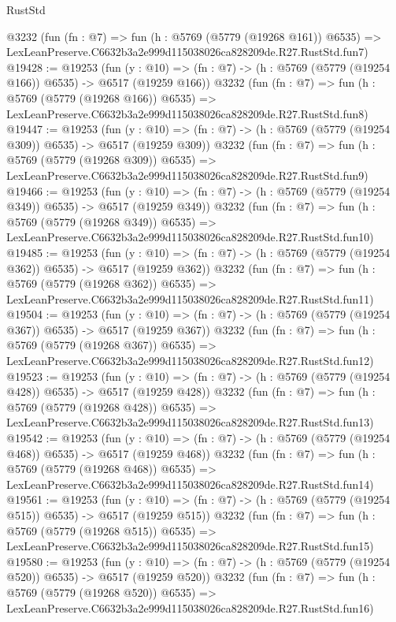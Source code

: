 \begin{lexlean}{RustStd}
\begin{coremodule}
    @3232
    (fun (fn : @7) =>
    fun (h : @5769 (@5779 (@19268 @161)) @6535) =>
    LexLeanPreserve.C6632b3a2e999d115038026ca828209de.R27.RustStd.fun7)
@19428 := @19253
    (fun (y : @10) => (fn : @7) -> (h : @5769 (@5779 (@19254 @166)) @6535) -> @6517 (@19259 @166))
    @3232
    (fun (fn : @7) =>
    fun (h : @5769 (@5779 (@19268 @166)) @6535) =>
    LexLeanPreserve.C6632b3a2e999d115038026ca828209de.R27.RustStd.fun8)
@19447 := @19253
    (fun (y : @10) => (fn : @7) -> (h : @5769 (@5779 (@19254 @309)) @6535) -> @6517 (@19259 @309))
    @3232
    (fun (fn : @7) =>
    fun (h : @5769 (@5779 (@19268 @309)) @6535) =>
    LexLeanPreserve.C6632b3a2e999d115038026ca828209de.R27.RustStd.fun9)
@19466 := @19253
    (fun (y : @10) => (fn : @7) -> (h : @5769 (@5779 (@19254 @349)) @6535) -> @6517 (@19259 @349))
    @3232
    (fun (fn : @7) =>
    fun (h : @5769 (@5779 (@19268 @349)) @6535) =>
    LexLeanPreserve.C6632b3a2e999d115038026ca828209de.R27.RustStd.fun10)
@19485 := @19253
    (fun (y : @10) => (fn : @7) -> (h : @5769 (@5779 (@19254 @362)) @6535) -> @6517 (@19259 @362))
    @3232
    (fun (fn : @7) =>
    fun (h : @5769 (@5779 (@19268 @362)) @6535) =>
    LexLeanPreserve.C6632b3a2e999d115038026ca828209de.R27.RustStd.fun11)
@19504 := @19253
    (fun (y : @10) => (fn : @7) -> (h : @5769 (@5779 (@19254 @367)) @6535) -> @6517 (@19259 @367))
    @3232
    (fun (fn : @7) =>
    fun (h : @5769 (@5779 (@19268 @367)) @6535) =>
    LexLeanPreserve.C6632b3a2e999d115038026ca828209de.R27.RustStd.fun12)
@19523 := @19253
    (fun (y : @10) => (fn : @7) -> (h : @5769 (@5779 (@19254 @428)) @6535) -> @6517 (@19259 @428))
    @3232
    (fun (fn : @7) =>
    fun (h : @5769 (@5779 (@19268 @428)) @6535) =>
    LexLeanPreserve.C6632b3a2e999d115038026ca828209de.R27.RustStd.fun13)
@19542 := @19253
    (fun (y : @10) => (fn : @7) -> (h : @5769 (@5779 (@19254 @468)) @6535) -> @6517 (@19259 @468))
    @3232
    (fun (fn : @7) =>
    fun (h : @5769 (@5779 (@19268 @468)) @6535) =>
    LexLeanPreserve.C6632b3a2e999d115038026ca828209de.R27.RustStd.fun14)
@19561 := @19253
    (fun (y : @10) => (fn : @7) -> (h : @5769 (@5779 (@19254 @515)) @6535) -> @6517 (@19259 @515))
    @3232
    (fun (fn : @7) =>
    fun (h : @5769 (@5779 (@19268 @515)) @6535) =>
    LexLeanPreserve.C6632b3a2e999d115038026ca828209de.R27.RustStd.fun15)
@19580 := @19253
    (fun (y : @10) => (fn : @7) -> (h : @5769 (@5779 (@19254 @520)) @6535) -> @6517 (@19259 @520))
    @3232
    (fun (fn : @7) =>
    fun (h : @5769 (@5779 (@19268 @520)) @6535) =>
    LexLeanPreserve.C6632b3a2e999d115038026ca828209de.R27.RustStd.fun16)

\end{coremodule}
\end{lexlean}
